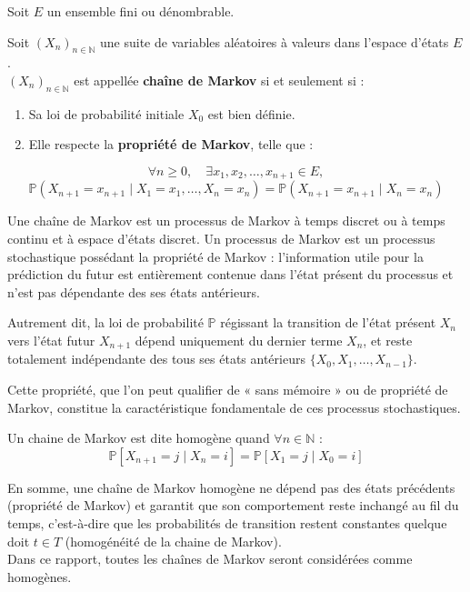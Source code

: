 \documentclass{article}
\begin{document}
\begin{tcolorbox}[colback=white,colframe=red!80!black,title=Chaîne de Markov]
Soit $E$ un ensemble fini ou dénombrable.

Soit $(X_n)_{n \in \mathbb{N}}$ une suite de variables aléatoires à valeurs dans l'espace d'états $E$. \\

$(X_n)_{n \in \mathbb{N}}$ est appellée \textbf{chaîne de Markov} si et seulement si :
\begin{enumerate}[leftmargin=5em, label=(\arabic*)]
  \item Sa loi de probabilité initiale $X_0$ est bien définie.
  \item Elle respecte la \textbf{propriété de Markov}, telle que :
\end{enumerate}
\[
\forall n \geq 0, \quad \exists x_1, x_2, \dots, x_{n+1} \in E,
\]
\[
\mathbb{P}(X_{n+1} = x_{n+1} \mid X_1 = x_1, \dots, X_n = x_n) = \mathbb{P}(X_{n+1} = x_{n+1} \mid X_n = x_n)
\]
\end{tcolorbox}

Une chaîne de Markov est un processus de Markov à temps discret ou à temps continu et à espace d'états discret. Un processus de Markov est un processus stochastique possédant la propriété de Markov : l'information utile pour la prédiction du futur est entièrement contenue dans l'état présent du processus et n'est pas dépendante des ses états antérieurs.

Autrement dit, la loi de probabilité $\mathbb{P}$ régissant la transition de l'état présent $X_n$ vers l'état futur $X_{n+1}$ dépend uniquement du dernier terme $X_n$, et reste totalement indépendante des tous ses états antérieurs $\{X_0, X_1, \dots, X_{n-1}\}$.

Cette propriété, que l'on peut qualifier de « sans mémoire » ou de propriété de Markov, constitue la caractéristique fondamentale de ces processus stochastiques.

\begin{tcolorbox}[colback=white,colframe=blue!80!black,title=Chaine de Markov Homogène]
Un chaine de Markov est dite homogène quand $\forall n \in \mathbb{N}$ :
\[
  \mathbb{P}[X_{n+1} = j \mid X_n = i] = \mathbb{P}[X_1 = j \mid X_0 = i]
\]
\end{tcolorbox}

En somme, une chaîne de Markov homogène ne dépend pas des états précédents (propriété de Markov) et garantit que son comportement reste inchangé au fil du temps, c'est-à-dire que les probabilités de transition restent constantes quelque doit $t \in T$ (homogénéité de la chaine de Markov). \\
Dans ce rapport, toutes les chaînes de Markov seront considérées comme homogènes.
\end{document}
